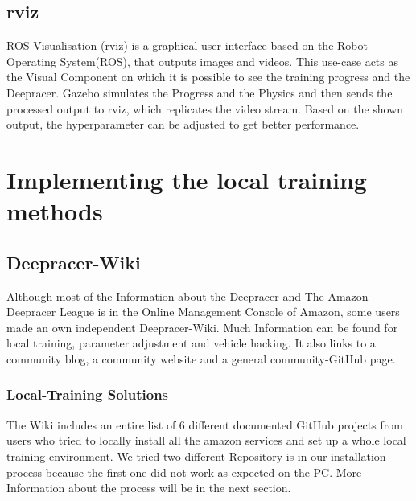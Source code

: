 \subsection{rviz}
ROS Visualisation (rviz) is a graphical user interface based on the Robot Operating System(ROS), that outputs images and videos. This use-case acts as the Visual Component on which it is possible to see the training progress and the Deepracer. Gazebo simulates the Progress and the Physics and then sends the processed output to rviz, which replicates the video stream. Based on the shown output, the hyperparameter can be adjusted to get better performance.

\section{Implementing the local training methods}

\subsection{Deepracer-Wiki}
Although most of the Information about the Deepracer and The Amazon Deepracer League is in the Online Management Console of Amazon, some users made an own independent Deepracer-Wiki. Much Information can be found for local training, parameter adjustment and vehicle hacking. It also links to a community blog, a community website and a general community-GitHub page. 

\subsubsection{Local-Training Solutions}
The Wiki includes an entire list of 6 different documented GitHub projects from users who tried to locally install all the amazon services and set up a whole local training environment. We tried two different Repository is in our installation process because the first one did not work as expected on the PC. More Information about the process will be in the next section.

